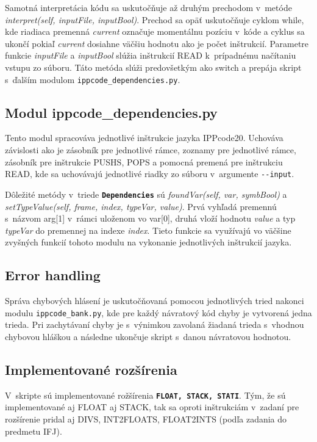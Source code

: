 \documentclass[11pt, a4paper]{article}
\begin{document}
Samotná interpretácia kódu sa uskutočňuje až druhým prechodom v~metóde \emph{interpret(self, inputFile, input\-Bool)}. Prechod sa opäť uskutočňuje cyklom while, kde riadiaca premenná \emph{current} označuje momentálnu pozíciu v~kóde a cyklus sa ukončí pokiaľ \emph{current} dosiahne väčšiu hodnotu ako je počet inštrukcií. Parametre funkcie \emph{inputFile} a \emph{inputBool} slúžia inštrukcií READ k~prípadnému načítaniu vstupu zo súboru. Táto metóda slúži predovšetkým ako switch a prepája skript s~ďalším modulom \texttt{ippcode\_depen\-dencies.py}.

     	\subsection{Modul ippcode\_dependencies.py}
     	Tento modul spracováva jednotlivé inštrukcie jazyka IPPcode20. Uchováva závislosti ako je zásobník pre jednotlivé rámce, zoznamy pre jednotlivé rámce, zásobník pre inštrukcie PUSHS, POPS a pomocná premená pre inštrukciu READ, kde sa uchovávajú jednotlivé riadky zo súboru v~argumente \texttt{-{-}input}. 
	
	Dôležité metódy v~triede \textbf{\texttt{Dependencies}} sú \emph{foundVar(self, var, symbBool)} a \emph{setTypeValue(self, frame, index, typeVar, value)}. Prvá vyhľadá premennú s~názvom arg[1] v~rámci uloženom vo var[0], druhá vloží hodnotu \emph{value} a typ \emph{typeVar} do premennej na indexe \emph{index}. Tieto funkcie sa využívajú vo väčšine zvyšných funkcií tohoto modulu na vykonanie jednotlivých inštrukcií jazyka. 
	
	\subsection{Error handling}
	Správa chybových hlásení je uskutočňovaná pomocou jednotlivých tried nakonci modulu \texttt{ippcode\_bank.py}, kde pre každý návratový kód chyby je vytvorená jedna trieda. Pri zachytávaní chyby je s~výnimkou zavolaná žiadaná trieda s~vhodnou chybovou hláškou a následne ukončuje skript s~danou návratovou hodnotou.
	
	\subsection{Implementované rozšírenia}
	V~skripte sú implementované rožšírenia \textbf{\texttt{FLOAT,\,STACK,\,STATI}}. Tým, že sú implementované aj FLOAT aj STACK, tak sa oproti inštrukciám v~zadaní pre rozšírenie pridal aj DIVS, INT2FLOATS, FLOAT2INTS (podľa zadania do predmetu IFJ). 
	
\end{document}
